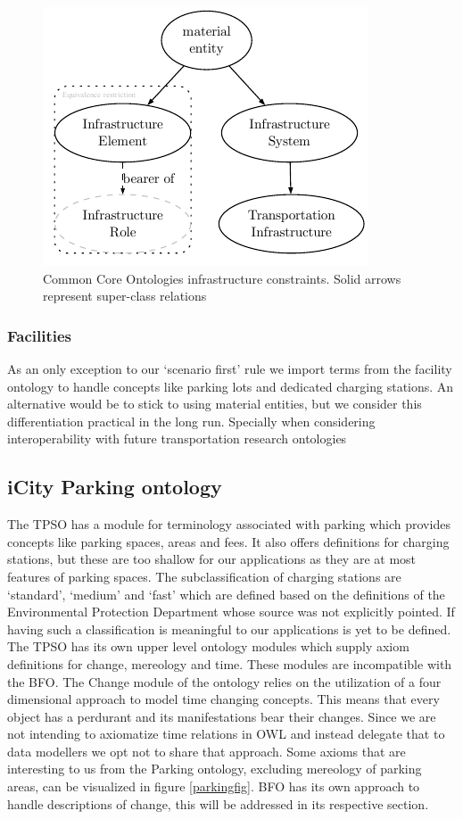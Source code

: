 \begin{figure}[h]
    \centering
    \includegraphics{images/infrastructureSystem.pdf}
    \caption{Common Core Ontologies infrastructure constraints. Solid arrows represent super-class relations}
    \label{infrastructurefigs} 
\end{figure}

\subsubsection{Facilities}

As an only exception to our `scenario first' rule we import terms from the
facility ontology to handle concepts like parking lots and dedicated charging
stations. An alternative would be to stick to using material entities, but we
consider this differentiation practical in the long run. Specially when
considering interoperability with future transportation research ontologies


\subsection{iCity Parking ontology}

The TPSO has a module for terminology associated with parking which provides
concepts like parking spaces, areas and fees. It also offers definitions for
charging stations, but these are too shallow for our applications as they are
at most features of parking spaces. The subclassification of charging stations
are `standard', `medium' and `fast' which are defined based on the definitions
of the Environmental Protection Department whose source was not explicitly
pointed. If having such a classification is meaningful to our applications is
yet to be defined. The TPSO has its own upper level ontology modules which
supply axiom definitions for change, mereology and time. These modules are
incompatible with the BFO. The Change module of the ontology relies on the
utilization of a four dimensional approach to model time changing concepts.
This means that every object has a perdurant and its manifestations bear their
changes. Since we are not intending to axiomatize time relations in OWL and
instead delegate that to data modellers we opt not to share that approach. Some
axioms that are interesting to us from the Parking ontology, excluding
mereology of parking areas, can be visualized in figure \ref{parkingfig}. BFO
has its own approach to handle descriptions of change, this will be addressed
in its respective section.

